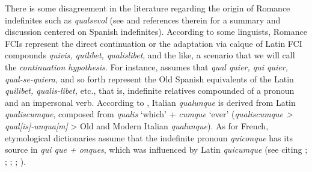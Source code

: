 \documentclass[output=paper,colorlinks,citecolor=brown]{langscibook}
\begin{document}
There is some disagreement in the literature regarding the origin of Romance indefinites such as \textit{qualsevol} (see \cite[][1068--1088]{CompanyCompanyPozasLoyo2009} and references therein for a summary and discussion centered on Spanish indefinites). According to some linguists, Romance FCIs represent the direct continuation or the adaptation via calque of Latin FCI compounds \textit{quivis, quilibet, qualislibet}, and the like, a scenario that we will call the \textit{continuation hypothesis}. For instance, \citet{MenéndezPidal1928} assumes that \textit{qual quier, qui quier, qual-se-quiera,} and so forth represent the Old Spanish equivalents of the Latin \textit{quilibet, qualis-libet,} etc., that is, indefinite relatives compounded of a pronoun and an impersonal verb. According to \citet[][57]{MeyerLübke1899}, Italian \textit{qualunque} is derived from Latin \textit{qualiscumque}, composed from \textit{qualis} ‘which’ + \textit{cumque} ‘ever’ (\textit{qualiscumque > qual[is]-unqua[m]} > Old and Modern Italian \textit{qualunque}). As for French, etymological dictionaries assume that the indefinite pronoun \textit{quiconque} has its source in \textit{qui que + onques}, which was influenced by Latin \textit{quicumque} (see \cite{Becker2014} citing \cite[][vol. 6, 511]{Godefroy2006}; \cite[525]{BlochWartburg1975}; \cite[][737]{Gamillscheg1969}; \cite[][489]{Greimas1998}; \cite[][vol. 8, 91]{ToblerLommatzsch1925}).
\end{document}
